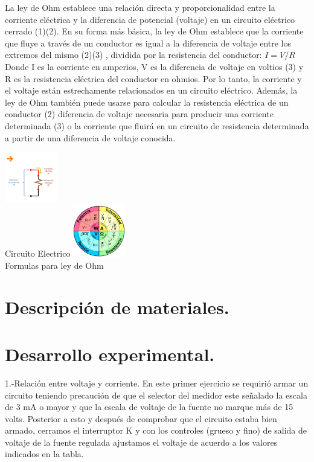 \documentclass[10pt]{article}
\begin{document}
\begin{multicols}{2}
La ley de Ohm establece una relación directa y proporcionalidad entre la corriente eléctrica y la diferencia de potencial (voltaje) en un circuito eléctrico cerrado (1)(2). En su forma más básica, la ley de Ohm establece que la corriente que fluye a través de un conductor es igual a la diferencia de voltaje entre los extremos del mismo (2)(3) , dividida por la resistencia del conductor:
$I = V/R$
Donde I es la corriente en amperios, V es la diferencia de voltaje en voltios (3) y R es la resistencia eléctrica del conductor en ohmios. Por lo tanto, la corriente y el voltaje están estrechamente relacionados en un circuito eléctrico. Además, la ley de Ohm también puede usarse para calcular la resistencia eléctrica de un conductor (2) diferencia de voltaje necesaria para producir una corriente determinada (3) o la corriente que fluirá en un circuito de resistencia determinada a partir de una diferencia de voltaje conocida.
\begin{center}
	
\includegraphics[width=0.17\textwidth]{lol}\\
Circuito Electrico \newline
\includegraphics[width=0.17\textwidth]{reina}\\
Formulas para ley de Ohm

\end{center}
\section{Descripción de materiales.}



\section{Desarrollo experimental.}

1.-Relación entre voltaje y corriente. 
En este primer ejercicio se requirió armar un circuito teniendo precaución de que el selector del medidor este señalado la escala de 3 mA  o mayor y que la escala de voltaje de la fuente no marque más de 15 volts. 
Posterior a esto y después de comprobar que el circuito estaba bien armado, cerramos el interruptor K y con los controles (grueso y fino) de salida de voltaje de la fuente regulada ajustamos el voltaje de acuerdo a los valores indicados en la tabla.
 

\end{multicols}
\end{document}
